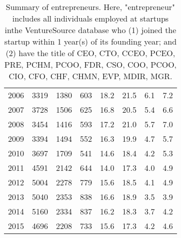 \begin{table}[ht]
\begin{tabular}{p{1.75cm}p{1.75cm}p{1.75cm}p{1.75cm}p{1.75cm}p{1.75cm}p{1.75cm}p{1.75cm}}
  2006 & 3319 & 1380 & 603 & 18.2 & 21.5 & 6.1 & 7.2 \\ 
  2007 & 3728 & 1506 & 625 & 16.8 & 20.5 & 5.4 & 6.6 \\ 
  2008 & 3454 & 1416 & 593 & 17.2 & 21.0 & 5.7 & 7.0 \\ 
  2009 & 3394 & 1494 & 552 & 16.3 & 19.9 & 4.7 & 5.7 \\ 
  2010 & 3697 & 1709 & 541 & 14.6 & 18.4 & 4.2 & 5.3 \\ 
  2011 & 4591 & 2142 & 644 & 14.0 & 17.3 & 4.0 & 4.9 \\ 
  2012 & 5004 & 2278 & 779 & 15.6 & 18.5 & 4.1 & 4.9 \\ 
  2013 & 5040 & 2353 & 838 & 16.6 & 18.9 & 3.5 & 3.9 \\ 
  2014 & 5160 & 2334 & 837 & 16.2 & 18.3 & 3.7 & 4.2 \\ 
  2015 & 4696 & 2208 & 733 & 15.6 & 17.3 & 4.2 & 4.6 \\ 
   \bottomrule
\end{tabular}
\endgroup
\caption{Summary of entrepreneurs. Here, "entrepreneur" includes all individuals employed at startups inthe VentureSource database who (1) joined the startup within 1 year(s) of its founding year; and (2) have the title of CEO, CTO, CCEO, PCEO, PRE, PCHM, PCOO, FDR, CSO, COO, PCOO, CIO, CFO, CHF, CHMN, EVP, MDIR, MGR.} 
\end{table}

